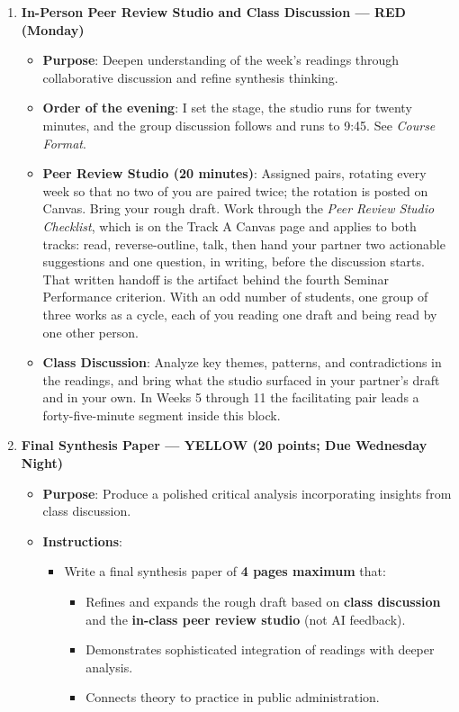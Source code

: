 \documentclass[11pt]{article}     %
\begin{document}
\begin{enumerate}
    \item \textbf{In-Person Peer Review Studio and Class Discussion --- RED (Monday)}
        \begin{itemize}
            \item \textbf{Purpose}: Deepen understanding of the week's readings through collaborative discussion and refine synthesis thinking.
            \item \textbf{Order of the evening}: I set the stage, the studio runs for twenty minutes, and the group discussion follows and runs to 9:45. See \emph{Course Format}.
            \item \textbf{Peer Review Studio (20 minutes)}: Assigned pairs, rotating every week so that no two of you are paired twice; the rotation is posted on Canvas. Bring your rough draft. Work through the \emph{Peer Review Studio Checklist}, which is on the Track A Canvas page and applies to both tracks: read, reverse-outline, talk, then hand your partner two actionable suggestions and one question, in writing, before the discussion starts. That written handoff is the artifact behind the fourth Seminar Performance criterion. With an odd number of students, one group of three works as a cycle, each of you reading one draft and being read by one other person.
            \item \textbf{Class Discussion}: Analyze key themes, patterns, and contradictions in the readings, and bring what the studio surfaced in your partner's draft and in your own. In Weeks 5 through 11 the facilitating pair leads a forty-five-minute segment inside this block.
        \end{itemize}

\item \textbf{Final Synthesis Paper --- YELLOW (20 points; Due Wednesday Night)}
\begin{itemize}
    \item \textbf{Purpose}: Produce a polished critical analysis incorporating insights from class discussion.
    \item \textbf{Instructions}:
    \begin{itemize}
        \item Write a final synthesis paper of \textbf{4 pages maximum} that:
        \begin{itemize}
            \item Refines and expands the rough draft based on \textbf{class discussion} and the \textbf{in-class peer review studio} (not AI feedback).
            \item Demonstrates sophisticated integration of readings with deeper analysis.
            \item Connects theory to practice in public administration.
        \end{itemize}


\end{itemize}
\end{itemize}
\end{enumerate}
\end{document}
